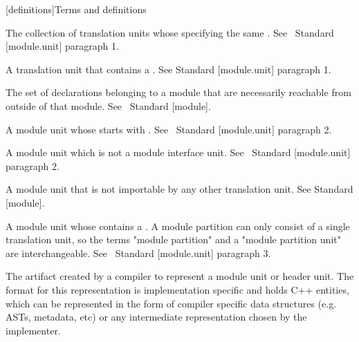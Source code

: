 
[definitions]{Terms and definitions}


The collection of translation units whose 
specifying the same . See \Cpp~Standard [module.unit]
paragraph 1.

A translation unit that contains a . See \Cpp
Standard [module.unit] paragraph 1.

The set of declarations belonging to a module that are necessarily reachable
from outside of that module. See \Cpp~Standard [module].

A module unit whose  starts with
. See \Cpp~Standard [module.unit] paragraph 2.

A module unit which is not a module interface unit. See \Cpp~Standard
[module.unit] paragraph 2.

A module unit that is not importable by any other translation unit. See \Cpp
Standard [module].

A module unit whose  contains a
. A module partition can only consist of a single
translation unit, so the terms "module partition" and a "module partition unit"
are interchangeable. See \Cpp~Standard [module.unit] paragraph 3.

The artifact created by a compiler to represent a module unit or header unit.
The format for this representation is implementation specific and holds C++
entities, which can be represented in the form of compiler specific data
structures (e.g. ASTs, metadata, etc) or any intermediate representation chosen
by the implementer.

